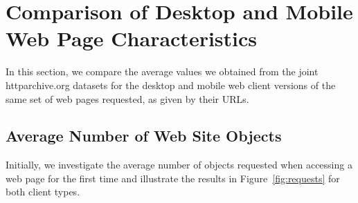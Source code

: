 \documentclass[onecolumn,12pt]{IEEEtran}
\begin{document}
\section{Comparison of Desktop and Mobile Web Page Characteristics}
\label{s:compare}
In this section, we compare the average values we obtained from the joint httparchive.org datasets for the desktop and mobile web client versions of the same set of web pages requested, as given by their URLs.


\subsection{Average Number of Web Site Objects}
\label{ss:objects}
Initially, we investigate the average number of objects requested when accessing a web page for the first time and illustrate the results in Figure~\ref{fig:requests} for both client types.
\end{document}
